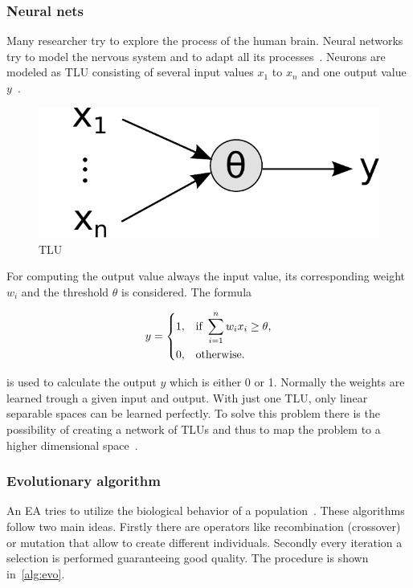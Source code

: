 \subsubsection{Neural nets} 
Many researcher try to explore the process of the human brain. Neural networks try to model the nervous system and to adapt all its processes~\cite{nn_intro}. Neurons are modeled as \ac{TLU} consisting of several input values $x_1$ to $x_n$ and one output value $y$~\cite{ci_kruse}. 


\begin{figure}
\centering
\includegraphics[scale=0.5]{images/tlu.pdf}
\caption{\ac{TLU}~\cite{ci_kruse}}
\label{fig:tlu}
\end{figure}


For computing the output value always the input value, its corresponding weight $w_i$ and the threshold $\theta$ is considered. The formula 

\begin{equation}
    y = 
\begin{dcases}
    1, & \text{if } \sum_{i=1}^n w_{i} x_{i} \geq \theta \text{,} \\
    0, & \text{otherwise.}
\end{dcases}
\end{equation}

is used to calculate the output $y$ which is either 0 or 1.
Normally the weights are learned trough a given input and output. With just one \ac{TLU}, only linear separable spaces can be learned perfectly.
To solve this problem there is the possibility of creating a network of \acp{TLU} and thus to map the problem to a higher dimensional space~\cite{ci_kruse}.


\subsubsection{Evolutionary algorithm} 
An \ac{EA} tries to utilize the biological behavior of a population~\cite{evo}. 
These algorithms follow two main ideas. Firstly there are operators like recombination (crossover) or
mutation that allow to create different individuals. Secondly every iteration a selection is performed guaranteeing good quality.
The procedure is shown in~\cref{alg:evo}. 


